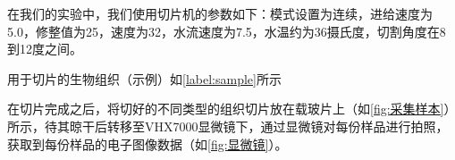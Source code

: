 



在我们的实验中，我们使用切片机的参数如下：模式设置为连续，进给速度为5.0，修整值为25，速度为32，水流速度为7.5，水温约为36摄氏度，切割角度在8到12度之间。

用于切片的生物组织（示例）如\autoref{label:sample}所示

在切片完成之后，将切好的不同类型的组织切片放在载玻片上（如\autoref{fig:采集样本}）所示，待其晾干后转移至VHX7000显微镜下，通过显微镜对每份样品进行拍照，获取到每份样品的电子图像数据（如\autoref{fig:显微镜}）。

